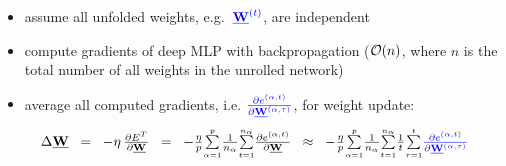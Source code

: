 \begin{frame}\frametitle{\subsubsecname}
	\begin{minipage}{\textwidth} \hspace{5mm}
	\end{minipage}
	\vspace{1mm}
	\begin{itemize}
		\item<1-> assume all unfolded weights, 
				e.g.~$\color{blue}\vec W^{(t)}$, are independent
		\vspace{1mm}
		\item<2-> compute gradients of deep MLP with backpropagation 
				($ \Set O(n)$, where $n$ is the total number of all weights in the unrolled network)
		\vspace{1mm}
		\item<3-> average all computed gradients, i.e.  
				${\color{blue} \frac{\partial e^{(\alpha,t)}}%
				{\partial \vec W^{(\alpha,\tau)}}}$, 
				for weight update:\\
				\vspace{-1mm}
			$$ \hspace{-5mm}
				\Delta \vec W \;\; = \;\;
					-\eta \, \smallfrac{\partial E^T}{\partial \vec W}
				\;\;=\;\; -\smallfrac{\eta}{p} 
					\smallsum{\alpha=1}{p} \smallfrac{1}{n_{\alpha}}  \smallsum{t=1}{n_{\alpha}}
					\smallfrac{\partial e^{(\alpha, t)}}{\partial \vec W}
				\;\;\approx\;\; -\smallfrac{\eta}{p}
					\smallsum{\alpha=1}{p} \smallfrac{1}{n_{\alpha}} \smallsum{t=1}{n_{\alpha}} \smallfrac{1}{t} \smallsum{\tau=1}{t}
					{\color{blue} \smallfrac{\partial e^{(\alpha,t)}}%
						{\partial \vec W^{(\alpha,\tau)}}}
			$$
	\end{itemize}
\end{frame}


